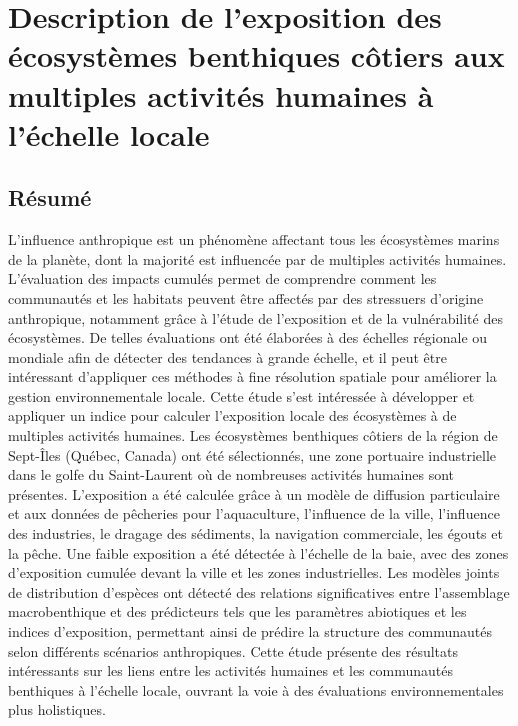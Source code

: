 \chapter{Description de l'exposition des écosystèmes benthiques côtiers aux multiples activités humaines à l'échelle locale}
\label{chap3}

\section{Résumé}
L'influence anthropique est un phénomène affectant tous les écosystèmes marins de la planète, dont la majorité est influencée par de multiples activités humaines. L'évaluation des impacts cumulés permet de comprendre comment les communautés et les habitats peuvent être affectés par des stressuers d'origine anthropique, notamment grâce à l'étude de l'exposition et de la vulnérabilité des écosystèmes. De telles évaluations ont été élaborées à des échelles régionale ou mondiale afin de détecter des tendances à grande échelle, et il peut être intéressant d'appliquer ces méthodes à fine résolution spatiale pour améliorer la gestion environnementale locale. Cette étude s'est intéressée à développer et appliquer un indice pour calculer l'exposition locale des écosystèmes à de multiples activités humaines. Les écosystèmes benthiques côtiers de la région de Sept-Îles (Québec, Canada) ont été sélectionnés, une zone portuaire industrielle dans le golfe du Saint-Laurent où de nombreuses activités humaines sont présentes. L'exposition a été calculée grâce à un modèle de diffusion particulaire et aux données de pêcheries pour l'aquaculture, l'influence de la ville, l'influence des industries, le dragage des sédiments, la navigation commerciale, les égouts et la pêche. Une faible exposition a été détectée à l'échelle de la baie, avec des zones d'exposition cumulée devant la ville et les zones industrielles. Les modèles joints de distribution d'espèces ont détecté des relations significatives entre l'assemblage macrobenthique et des prédicteurs tels que les paramètres abiotiques et les indices d'exposition, permettant ainsi de prédire la structure des communautés selon différents scénarios anthropiques. Cette étude présente des résultats intéressants sur les liens entre les activités humaines et les communautés benthiques à l'échelle locale, ouvrant la voie à des évaluations environnementales plus holistiques. \linebreak[4]

